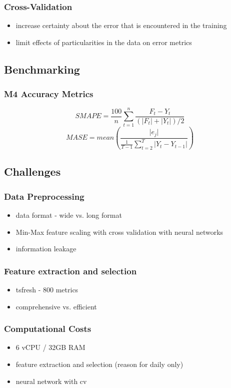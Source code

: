 \documentclass[11pt]{article}
\begin{document}
\subsubsection*{Cross-Validation}
\label{sec:orgcda258a}
\begin{itemize}
\item increase certainty about the error that is encountered in the training
\item limit effects of particularities in the data on error metrics
\end{itemize}
\subsection*{Benchmarking}
\label{sec:orga923736}
\subsubsection*{M4 Accuracy Metrics}
\label{sec:org52862e2}
$$ SMAPE = \frac{100}{n} \sum_{t=1}^{n} \frac{F_t - Y_t}{(\lvert F_t \rvert + \lvert Y_t \rvert)/2} $$
$$ MASE = mean \left( \frac{\lvert e_j \rvert}{\frac{1}{T-1} \sum_{t=2}^{T} \lvert Y_t - Y_{t-1} \rvert} \right) $$
\subsection*{Challenges}
\label{sec:orgd121099}
\subsubsection*{Data Preprocessing}
\label{sec:orgcab51b3}
\begin{itemize}
\item data format - wide vs. long format
\item Min-Max feature scaling with cross validation with neural networks
\item information leakage
\end{itemize}
\subsubsection*{Feature extraction and selection}
\label{sec:orgec68efa}
\begin{itemize}
\item tsfresh - 800 metrics
\item comprehensive vs. efficient
\end{itemize}
\subsubsection*{Computational Costs}
\label{sec:orgbd6a769}
\begin{itemize}
\item 6 vCPU / 32GB RAM
\item feature extraction and selection (reason for daily only)
\item neural network with cv
\end{itemize}
\end{document}
